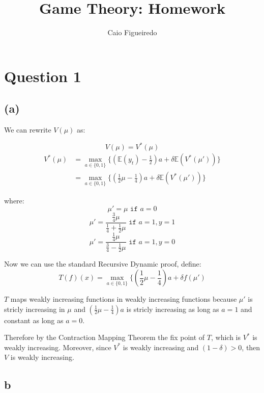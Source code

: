 \documentclass{article}
\title{Game Theory: Homework} %
\author{Caio Figueiredo} %
\begin{document}
\maketitle %


\section{Question 1}
\subsection{(a)} %

We can rewrite $V(\mu)$ as:

\[ 
  V(\mu) = V^*(\mu) 
\]
\begin{equation}
  \begin{split}
    V^*(\mu) & = \max_{a \in \{0, 1\}}\{(\mathbb{E}(y_t) - \frac{1}{2})a + \delta \mathbb{E}(V^*(\mu'))\} \\
             & = \max_{a \in \{0, 1\}}\{(\frac{1}{2}\mu  - \frac{1}{4})a + \delta \mathbb{E}(V^*(\mu'))\}
  \end{split}
\end{equation}

where:
\[
  \mu' =  \mu \texttt{ if } a = 0
\]
\[
  \mu' = \frac{\frac{3}{4}\mu}{\frac{1}{4} + \frac{1}{2}\mu} \texttt{ if } a = 1, y = 1
\]
\[
  \mu' = \frac{\frac{1}{4}\mu}{\frac{3}{4} - \frac{1}{2}\mu} \texttt{ if } a = 1, y = 0
\]

Now we can use the standard Recursive Dynamic proof, define:
\[
  T(f)(x) = \max_{a \in \{0, 1\}}\{(\frac{1}{2}\mu  - \frac{1}{4})a + \delta f(\mu')
\]

$T$ maps weakly increasing functions in weakly increasing functions because $\mu'$
is stricly increasing in $\mu$ and $(\frac{1}{2}\mu  - \frac{1}{4})a$ is stricly
increasing as long as $a = 1$ and constant as long as $a = 0$.

Therefore by the Contraction Mapping Theorem the fix point of $T$, which is $V^*$
is weakly increasing. Moreover, since $V^*$ is weakly increasing and $(1 - \delta) > 0$,
then $V$ is weakly increasing.

\subsection{b} %
\end{document}
